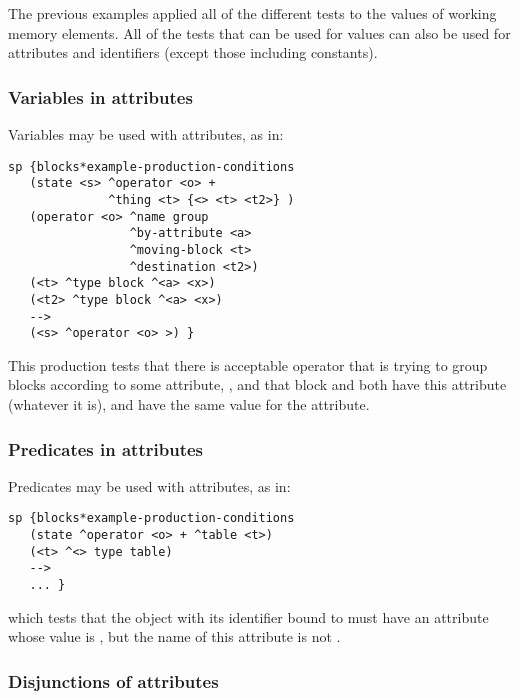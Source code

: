 The previous examples applied all of the different tests to the values of working memory elements. All of the tests that can be used for values can also be used for attributes and identifiers (except those including constants).

\subsubsection*{Variables in attributes}

Variables may be used with attributes, as in:

\begin{verbatim}
sp {blocks*example-production-conditions
   (state <s> ^operator <o> + 
              ^thing <t> {<> <t> <t2>} )
   (operator <o> ^name group 
                 ^by-attribute <a>
                 ^moving-block <t>
                 ^destination <t2>)
   (<t> ^type block ^<a> <x>)
   (<t2> ^type block ^<a> <x>)
   -->
   (<s> ^operator <o> >) }
\end{verbatim}

This production tests that there is acceptable operator that is trying to group blocks according to some attribute, , and that block  and  both have this attribute (whatever it is), and have the same value for the attribute.


\subsubsection*{Predicates in attributes}

Predicates may be used with attributes, as in:

\begin{verbatim}
sp {blocks*example-production-conditions
   (state ^operator <o> + ^table <t>)
   (<t> ^<> type table)
   -->
   ... }
\end{verbatim}

which tests that the object with its identifier bound to  must have an attribute whose value is , but the name of this attribute is not .

\subsubsection*{Disjunctions of attributes}
\index{<< >>}

